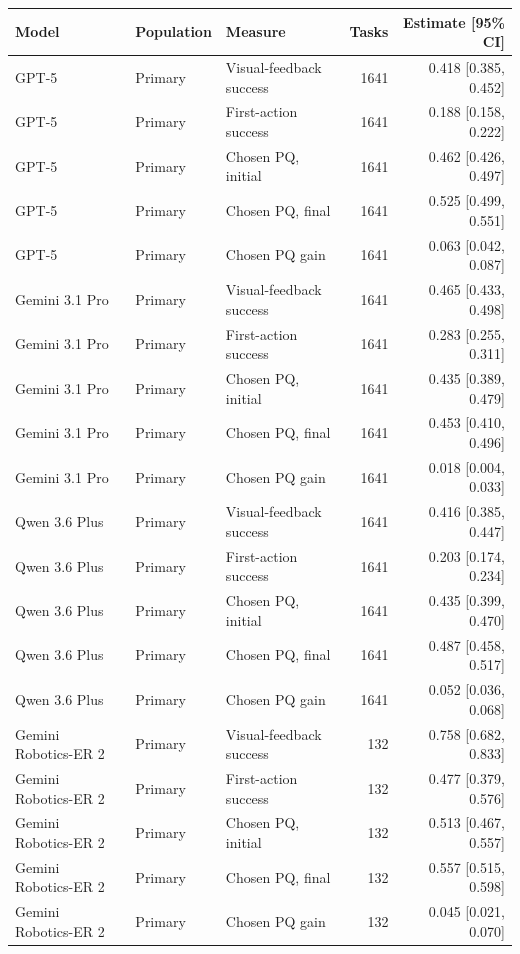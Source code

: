 \begin{tabular}{lllrr}
\toprule
Model & Population & Measure & Tasks & Estimate [95\% CI] \\
\midrule
GPT-5 & Primary & Visual-feedback success & 1641 & 0.418 [0.385, 0.452] \\
GPT-5 & Primary & First-action success & 1641 & 0.188 [0.158, 0.222] \\
GPT-5 & Primary & Chosen PQ, initial & 1641 & 0.462 [0.426, 0.497] \\
GPT-5 & Primary & Chosen PQ, final & 1641 & 0.525 [0.499, 0.551] \\
GPT-5 & Primary & Chosen PQ gain & 1641 & 0.063 [0.042, 0.087] \\
Gemini 3.1 Pro & Primary & Visual-feedback success & 1641 & 0.465 [0.433, 0.498] \\
Gemini 3.1 Pro & Primary & First-action success & 1641 & 0.283 [0.255, 0.311] \\
Gemini 3.1 Pro & Primary & Chosen PQ, initial & 1641 & 0.435 [0.389, 0.479] \\
Gemini 3.1 Pro & Primary & Chosen PQ, final & 1641 & 0.453 [0.410, 0.496] \\
Gemini 3.1 Pro & Primary & Chosen PQ gain & 1641 & 0.018 [0.004, 0.033] \\
Qwen 3.6 Plus & Primary & Visual-feedback success & 1641 & 0.416 [0.385, 0.447] \\
Qwen 3.6 Plus & Primary & First-action success & 1641 & 0.203 [0.174, 0.234] \\
Qwen 3.6 Plus & Primary & Chosen PQ, initial & 1641 & 0.435 [0.399, 0.470] \\
Qwen 3.6 Plus & Primary & Chosen PQ, final & 1641 & 0.487 [0.458, 0.517] \\
Qwen 3.6 Plus & Primary & Chosen PQ gain & 1641 & 0.052 [0.036, 0.068] \\
Gemini Robotics-ER 2 & Primary & Visual-feedback success & 132 & 0.758 [0.682, 0.833] \\
Gemini Robotics-ER 2 & Primary & First-action success & 132 & 0.477 [0.379, 0.576] \\
Gemini Robotics-ER 2 & Primary & Chosen PQ, initial & 132 & 0.513 [0.467, 0.557] \\
Gemini Robotics-ER 2 & Primary & Chosen PQ, final & 132 & 0.557 [0.515, 0.598] \\
Gemini Robotics-ER 2 & Primary & Chosen PQ gain & 132 & 0.045 [0.021, 0.070] \\
\bottomrule
\end{tabular}
